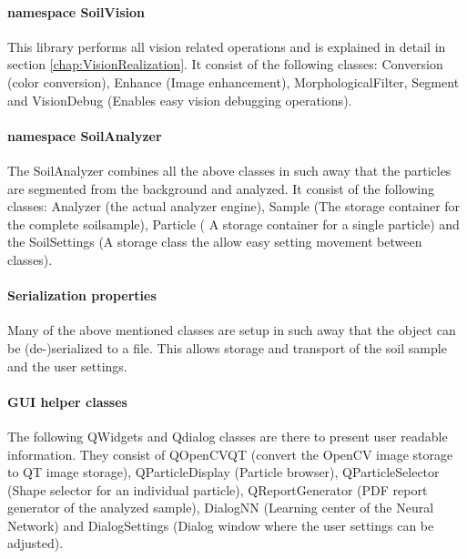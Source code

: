 \documentclass[11pt,fleqn,,a4paper,twoside,openright]{book}
\begin{document}
\paragraph{namespace SoilVision}
This library performs all vision related operations and is explained in detail in section \ref{chap:VisionRealization}. It consist of the following classes: Conversion (color conversion), Enhance (Image enhancement), MorphologicalFilter, Segment and VisionDebug (Enables easy vision debugging operations).

\paragraph{namespace SoilAnalyzer}
The SoilAnalyzer combines all the above classes in such away that the particles are segmented from the background and analyzed. It consist of the following classes: Analyzer (the actual analyzer engine), Sample (The storage container for the complete soilsample), Particle ( A storage container for a single particle) and the SoilSettings (A storage class the allow easy setting movement between classes).

\paragraph{Serialization properties}
Many of the above mentioned classes are setup in such away that the object can be (de-)serialized to a file. This allows storage and transport of the soil sample and the user settings.

\paragraph{GUI helper classes}
The following QWidgets and Qdialog classes are there to present user readable information. They consist of QOpenCVQT (convert the OpenCV image storage to QT image storage), QParticleDisplay (Particle browser), QParticleSelector (Shape selector for an individual particle), QReportGenerator (PDF report generator of the analyzed sample), DialogNN (Learning center of the Neural Network) and DialogSettings (Dialog window where the user settings can be adjusted).
\end{document}
